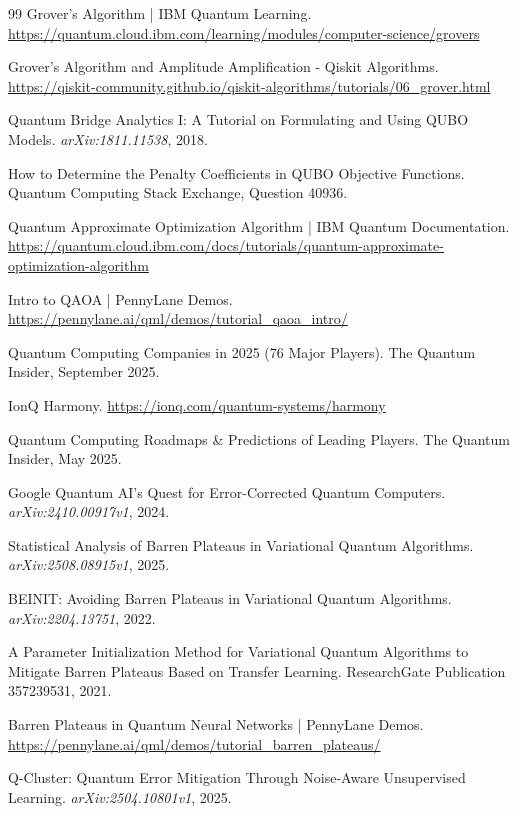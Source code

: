 \documentclass[11pt,a4paper]{article}
\begin{document}
\begin{thebibliography}{99}
Grover's Algorithm | IBM Quantum Learning.
\url{https://quantum.cloud.ibm.com/learning/modules/computer-science/grovers}

Grover's Algorithm and Amplitude Amplification - Qiskit Algorithms.
\url{https://qiskit-community.github.io/qiskit-algorithms/tutorials/06_grover.html}

Quantum Bridge Analytics I: A Tutorial on Formulating and Using QUBO Models.
\textit{arXiv:1811.11538}, 2018.

How to Determine the Penalty Coefficients in QUBO Objective Functions.
Quantum Computing Stack Exchange, Question 40936.

Quantum Approximate Optimization Algorithm | IBM Quantum Documentation.
\url{https://quantum.cloud.ibm.com/docs/tutorials/quantum-approximate-optimization-algorithm}

Intro to QAOA | PennyLane Demos.
\url{https://pennylane.ai/qml/demos/tutorial_qaoa_intro/}

Quantum Computing Companies in 2025 (76 Major Players).
The Quantum Insider, September 2025.

IonQ Harmony.
\url{https://ionq.com/quantum-systems/harmony}

Quantum Computing Roadmaps \& Predictions of Leading Players.
The Quantum Insider, May 2025.

Google Quantum AI's Quest for Error-Corrected Quantum Computers.
\textit{arXiv:2410.00917v1}, 2024.

Statistical Analysis of Barren Plateaus in Variational Quantum Algorithms.
\textit{arXiv:2508.08915v1}, 2025.

BEINIT: Avoiding Barren Plateaus in Variational Quantum Algorithms.
\textit{arXiv:2204.13751}, 2022.

A Parameter Initialization Method for Variational Quantum Algorithms to Mitigate Barren Plateaus Based on Transfer Learning.
ResearchGate Publication 357239531, 2021.

Barren Plateaus in Quantum Neural Networks | PennyLane Demos.
\url{https://pennylane.ai/qml/demos/tutorial_barren_plateaus/}

Q-Cluster: Quantum Error Mitigation Through Noise-Aware Unsupervised Learning.
\textit{arXiv:2504.10801v1}, 2025.


\end{thebibliography}
\end{document}

